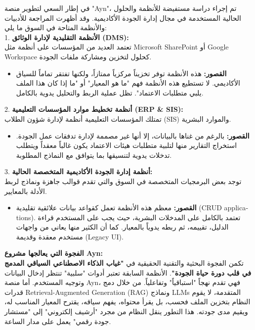 \documentclass[12pt, a4paper]{report}
\begin{document}
\begin{english}
في إطار السعي لتطوير منصة "Ayn"، تم إجراء دراسة مستفيضة للأنظمة والحلول الحالية المستخدمة في مجال إدارة الجودة الأكاديمية. وقد أظهرت المراجعة للأدبيات والأنظمة المتاحة في السوق ما يلي: \\

1. \textbf{الأنظمة التقليدية لإدارة الوثائق (DMS):} \\
تعتمد العديد من المؤسسات على أنظمة مثل Microsoft SharePoint أو Google Workspace كحلول لتخزين ومشاركة ملفات الجودة. \\
\begin{itemize}
\item \textbf{القصور:} هذه الأنظمة توفر تخزيناً مركزياً ممتازاً، ولكنها تفتقر تماماً للسياق الأكاديمي. لا تستطيع هذه الأنظمة فهم "ما هو المعيار" أو "ما إذا كان هذا الملف يلبي متطلبات الاعتماد". تظل عملية الربط والتحليل يدوية بالكامل.
\end{itemize}

2. \textbf{أنظمة تخطيط موارد المؤسسات التعليمية (ERP & SIS):} \\
تمتلك المؤسسات التعليمية أنظمة لإدارة شؤون الطلاب (SIS) والموارد البشرية. \\
\begin{itemize}
\item \textbf{القصور:} بالرغم من غناها بالبيانات، إلا أنها غير مصممة لإدارة تدفقات عمل الجودة. استخراج التقارير منها لتلبية متطلبات هيئات الاعتماد يكون غالباً معقداً ويتطلب تدخلات يدوية لتنسيقها بما يتوافق مع النماذج المطلوبة.
\end{itemize}

3. \textbf{أنظمة إدارة الجودة الأكاديمية المتخصصة الحالية:} \\
توجد بعض البرمجيات المتخصصة في السوق والتي تقدم قوالب جاهزة ونماذج لربط الأدلة بالمعايير. \\
\begin{itemize}
\item \textbf{القصور:} معظم هذه الأنظمة تعمل كقواعد بيانات علائقية تقليدية (CRUD applications). تعتمد بالكامل على المدخلات البشرية، حيث يجب على المستخدم قراءة الدليل، تقييمه، ثم ربطه يدوياً بالمعيار. كما أن الكثير منها يعاني من واجهات مستخدم معقدة وقديمة (Legacy UI).
\end{itemize}

\textbf{الفجوة التي يعالجها مشروع Ayn:} \\
تكمن الفجوة البحثية والتقنية الحقيقية في \textbf{"غياب الذكاء الاصطناعي السياقي المدمج في قلب دورة حياة الجودة"}. الأنظمة السابقة تعتبر أدوات "سلبية" تنتظر إدخال البيانات وتوجيه المستخدم. أما منصة Ayn، فهي تقدم نهجاً "استباقياً" وتفاعلياً. من خلال دمج قدرات Retrieval-Augmented Generation (RAG) ونماذج LLMs المتقدمة، لا يقوم النظام بتخزين الملف فحسب، بل يقرأ محتواه، يفهم سياقه، يقترح المعيار المناسب له، ويقيم مدى جودته. هذا التطور ينقل النظام من مجرد "أرشيف إلكتروني" إلى "مستشار جودة رقمي" يعمل على مدار الساعة. \\


\end{english}
\end{document}
